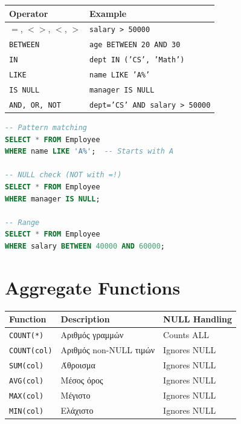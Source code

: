\begin{center}
\begin{tabular}{ll}
\toprule
\textbf{Operator} & \textbf{Example} \\
\midrule
$=$, $<>$, $<$, $>$ & \texttt{salary > 50000} \\
\texttt{BETWEEN} & \texttt{age BETWEEN 20 AND 30} \\
\texttt{IN} & \texttt{dept IN ('CS', 'Math')} \\
\texttt{LIKE} & \texttt{name LIKE 'A\%'} \\
\texttt{IS NULL} & \texttt{manager IS NULL} \\
\texttt{AND, OR, NOT} & \texttt{dept='CS' AND salary > 50000} \\
\bottomrule
\end{tabular}
\end{center}

\begin{examplebox}
\begin{lstlisting}[language=SQL]
-- Pattern matching
SELECT * FROM Employee
WHERE name LIKE 'A%';  -- Starts with A

-- NULL check (NOT with =!)
SELECT * FROM Employee
WHERE manager IS NULL;

-- Range
SELECT * FROM Employee
WHERE salary BETWEEN 40000 AND 60000;
\end{lstlisting}
\end{examplebox}

\section{Aggregate Functions}

\begin{formulabox}
\begin{center}
\begin{tabular}{lll}
\toprule
\textbf{Function} & \textbf{Description} & \textbf{NULL Handling} \\
\midrule
\texttt{COUNT(*)} & Αριθμός γραμμών & Counts ALL \\
\texttt{COUNT(col)} & Αριθμός non-NULL τιμών & Ignores NULL \\
\texttt{SUM(col)} & Άθροισμα & Ignores NULL \\
\texttt{AVG(col)} & Μέσος όρος & Ignores NULL \\
\texttt{MAX(col)} & Μέγιστο & Ignores NULL \\
\texttt{MIN(col)} & Ελάχιστο & Ignores NULL \\
\bottomrule
\end{tabular}
\end{center}
\end{formulabox}

